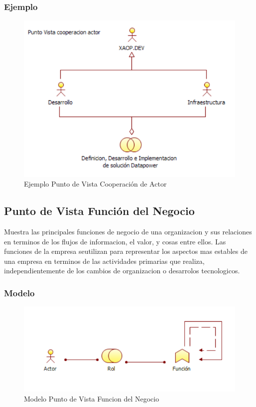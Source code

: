 \subsubsection{Ejemplo}
    \begin{figure}[th!]
        \centering
        \includegraphics[width=1.0\textwidth]{Arquitectura/images/Punto_de_Vista_de_Cooperacion.pdf}
        \caption{Ejemplo Punto de Vista Cooperación de Actor}
    \end{figure}
\newpage

\subsection{Punto de Vista Función del Negocio}
Muestra las principales funciones de negocio de una organizacion y sus relaciones en terminos de los flujos de informacion, el valor, y cosas entre ellos. Las funciones de la empresa seutilizan para representar los aspectos mas estables de una empresa en terminos de las actividades primarias que realiza, independientemente de los cambios de organizacion o desarrolos tecnologicos.
\subsubsection{Modelo}
    \begin{figure}[th!]
        \centering
        \includegraphics[width=1.0\textwidth]{Arquitectura/images/modelo/Punto_de_Vista_de_Funcion_del_Negocio.pdf}
        \caption{Modelo Punto de Vista Funcion del Negocio}
    \end{figure}
\newpage
